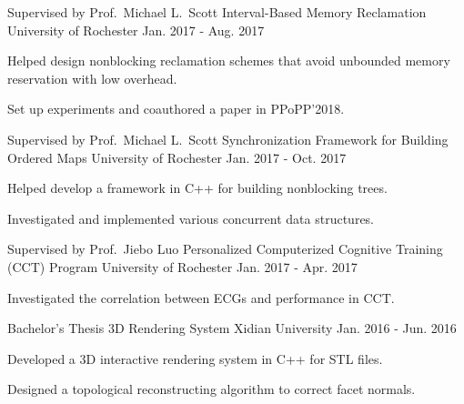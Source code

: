 \begin{cventries}
  \cventry
    {Supervised by Prof.\ Michael L.\ Scott} %
    {Interval-Based Memory Reclamation} %
    {University of Rochester} %
    {Jan. 2017 - Aug. 2017} %
    {
      \begin{cvitems} %
        \item {Helped design nonblocking reclamation schemes that avoid unbounded memory reservation with low overhead.}
        \item {Set up experiments and coauthored a paper in PPoPP'2018.}
      \end{cvitems}
    }

  \cventry
    {Supervised by Prof.\ Michael L.\ Scott} %
    {Synchronization Framework for Building Ordered Maps} %
    {University of Rochester} %
    {Jan. 2017 - Oct. 2017} %
    {
      \begin{cvitems} %
        \item {Helped develop a framework in C++ for building nonblocking trees.}
        \item {Investigated and implemented various concurrent data structures.}
      \end{cvitems}
    }

  \cventry
    {Supervised by Prof.\ Jiebo Luo} %
    {Personalized Computerized Cognitive Training (CCT) Program} %
    {University of Rochester} %
    {Jan. 2017 - Apr. 2017} %
    {
      \begin{cvitems} %
        \item {Investigated the correlation between ECGs and performance in CCT.}
      \end{cvitems}
    }

  \cventry
    {Bachelor's Thesis} %
    {3D Rendering System} %
    {Xidian University} %
    {Jan. 2016 - Jun. 2016} %
    {
      \begin{cvitems} %
        \item {Developed a 3D interactive rendering system in C++ for STL files.}
        \item {Designed a topological reconstructing algorithm to correct facet normals.}
      \end{cvitems}
    }


\end{cventries}
